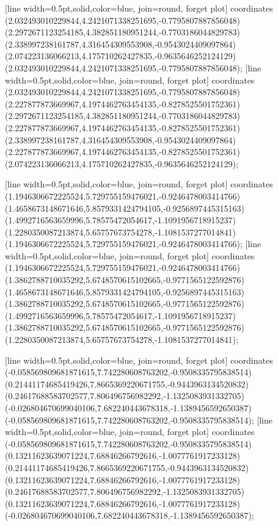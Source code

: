 [line width=0.5pt,solid,color=blue, join=round, forget plot] coordinates {(2.032493010229844,4.2421071338251695,-0.7795807887856048) (2.2972671123254185,4.382851180951244,-0.7703186044829783) (2.338997238161787,4.316454309553908,-0.9543024409097864) (2.074223136066213,4.175710262427835,-0.9635646252124129) (2.032493010229844,4.2421071338251695,-0.7795807887856048)};
[line width=0.5pt,solid,color=blue, join=round, forget plot] coordinates {(2.032493010229844,4.2421071338251695,-0.7795807887856048) (2.227877873669967,4.1974462763454135,-0.8278525501752361) (2.2972671123254185,4.382851180951244,-0.7703186044829783) (2.227877873669967,4.1974462763454135,-0.8278525501752361) (2.338997238161787,4.316454309553908,-0.9543024409097864) (2.227877873669967,4.1974462763454135,-0.8278525501752361) (2.074223136066213,4.175710262427835,-0.9635646252124129)};

[line width=0.5pt,solid,color=blue, join=round, forget plot] coordinates {(1.1946306672225524,5.729755159476021,-0.9246478003414766) (1.4658673148671646,5.8579331424794105,-0.9256897445315163) (1.4992716563659996,5.78575472054617,-1.1091956718915237) (1.2280350087213874,5.65757673754278,-1.1081537277014841) (1.1946306672225524,5.729755159476021,-0.9246478003414766)};
[line width=0.5pt,solid,color=blue, join=round, forget plot] coordinates {(1.1946306672225524,5.729755159476021,-0.9246478003414766) (1.3862788710035292,5.6748570615102665,-0.9771565122592876) (1.4658673148671646,5.8579331424794105,-0.9256897445315163) (1.3862788710035292,5.6748570615102665,-0.9771565122592876) (1.4992716563659996,5.78575472054617,-1.1091956718915237) (1.3862788710035292,5.6748570615102665,-0.9771565122592876) (1.2280350087213874,5.65757673754278,-1.1081537277014841)};

[line width=0.5pt,solid,color=blue, join=round, forget plot] coordinates {(-0.058569809681871615,7.742280608763202,-0.9508335795838514) (0.21441174685419426,7.8665369220671755,-0.9443963134520832) (0.24617688583702577,7.806496756982292,-1.1325083931332705) (-0.026804670699040106,7.682240443678318,-1.1389456592650387) (-0.058569809681871615,7.742280608763202,-0.9508335795838514)};
[line width=0.5pt,solid,color=blue, join=round, forget plot] coordinates {(-0.058569809681871615,7.742280608763202,-0.9508335795838514) (0.13211623639071224,7.68846266792616,-1.0077761917233128) (0.21441174685419426,7.8665369220671755,-0.9443963134520832) (0.13211623639071224,7.68846266792616,-1.0077761917233128) (0.24617688583702577,7.806496756982292,-1.1325083931332705) (0.13211623639071224,7.68846266792616,-1.0077761917233128) (-0.026804670699040106,7.682240443678318,-1.1389456592650387)};

